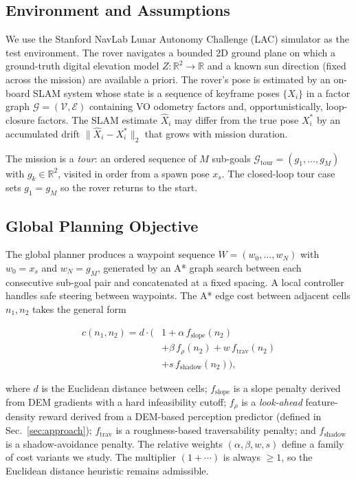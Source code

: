 \documentclass[letterpaper,times]{IONconf}
\begin{document}
\subsection{Environment and Assumptions}
We use the Stanford NavLab Lunar Autonomy Challenge (LAC) simulator as the test environment. The rover navigates a bounded 2D ground plane on which a ground-truth digital elevation model $Z : \mathbb{R}^2 \to \mathbb{R}$ and a known sun direction (fixed across the mission) are available a priori. The rover's pose is estimated by an on-board SLAM system whose state is a sequence of keyframe poses $\{X_i\}$ in a factor graph $\mathcal{G} = (\mathcal{V}, \mathcal{E})$ containing VO odometry factors and, opportunistically, loop-closure factors. The SLAM estimate $\hat{X}_i$ may differ from the true pose $X_i^*$ by an accumulated drift $\|\hat{X}_i - X_i^*\|_2$ that grows with mission duration.

The mission is a \emph{tour}: an ordered sequence of $M$ sub-goals $\mathcal{G}_{\text{tour}} = (g_1, \dots, g_M)$ with $g_k \in \mathbb{R}^2$, visited in order from a spawn pose $x_s$. The closed-loop tour case sets $g_1 = g_M$ so the rover returns to the start.

\subsection{Global Planning Objective}
The global planner produces a waypoint sequence $W = (w_0, \dots, w_N)$ with $w_0 = x_s$ and $w_N = g_M$, generated by an A* graph search between each consecutive sub-goal pair and concatenated at a fixed spacing. A local controller handles safe steering between waypoints. The A* edge cost between adjacent cells $n_1, n_2$ takes the general form

\begin{equation}
\label{eq:edge_cost}
\begin{aligned}
c(n_1, n_2) = d \cdot \Big(
    & 1
    + \alpha \, f_{\text{slope}}(n_2) \\
    & + \beta \, f_{\rho}(n_2)
    + w \, f_{\text{trav}}(n_2) \\
    & + s \, f_{\text{shadow}}(n_2)
\Big),
\end{aligned}
\end{equation}

where $d$ is the Euclidean distance between cells; $f_{\text{slope}}$ is a slope penalty derived from DEM gradients with a hard infeasibility cutoff; $f_{\rho}$ is a \emph{look-ahead} feature-density reward derived from a DEM-based perception predictor (defined in Sec.~\ref{sec:approach}); $f_{\text{trav}}$ is a roughness-based traversability penalty; and $f_{\text{shadow}}$ is a shadow-avoidance penalty. The relative weights $(\alpha, \beta, w, s)$ define a family of cost variants we study. The multiplier $(1 + \cdots)$ is always $\ge 1$, so the Euclidean distance heuristic remains admissible.
\end{document}
